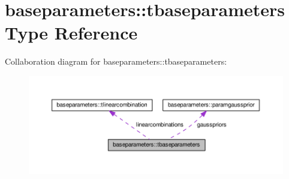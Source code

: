 \hypertarget{structbaseparameters_1_1tbaseparameters}{}\section{baseparameters\+:\+:tbaseparameters Type Reference}
\label{structbaseparameters_1_1tbaseparameters}


Collaboration diagram for baseparameters\+:\+:tbaseparameters\+:
\nopagebreak
\begin{figure}[H]
\begin{center}
\leavevmode
\includegraphics[width=350pt]{structbaseparameters_1_1tbaseparameters__coll__graph}
\end{center}
\end{figure}

